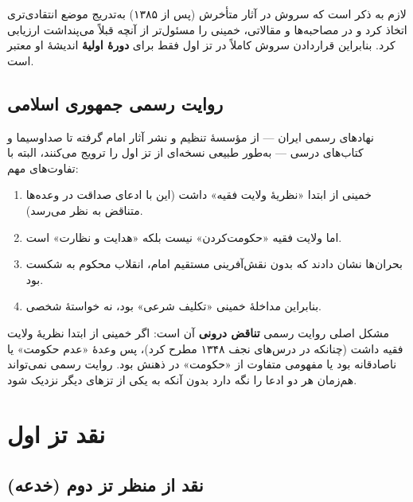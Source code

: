 \documentclass[12pt,a4paper]{book}
\newcommand{\keyword}[1]{\textbf{\textcolor{cPrimary}{#1}}}
\begin{document}
\begin{warningBox}
لازم به ذکر است که سروش در آثار متأخرش (پس از ۱۳۸۵) به‌تدریج موضع انتقادی‌تری اتخاذ کرد و در مصاحبه‌ها و مقالاتی، خمینی را مسئول‌تر از آنچه قبلاً می‌پنداشت ارزیابی کرد. بنابراین قراردادن سروش کاملاً در تز اول فقط برای \keyword{دورهٔ اولیهٔ} اندیشهٔ او معتبر است.
\end{warningBox}

\subsection{روایت رسمی جمهوری اسلامی}

نهادهای رسمی ایران — از مؤسسهٔ تنظیم و نشر آثار امام گرفته تا صداوسیما و کتاب‌های درسی — به‌طور طبیعی نسخه‌ای از تز اول را ترویج می‌کنند، البته با تفاوت‌های مهم:

\begin{principleBox}
\begin{enumerate}[label=\textcolor{cPrimary}{\arabic*.}, rightmargin=2em]
    \item خمینی از ابتدا «نظریهٔ ولایت فقیه» داشت (این با ادعای صداقت در وعده‌ها متناقض به نظر می‌رسد).
    \item اما ولایت فقیه «حکومت‌کردن» نیست بلکه «هدایت و نظارت» است.
    \item بحران‌ها نشان دادند که بدون نقش‌آفرینی مستقیم امام، انقلاب محکوم به شکست بود.
    \item بنابراین مداخلهٔ خمینی «تکلیف شرعی» بود، نه خواستهٔ شخصی.
\end{enumerate}
\end{principleBox}

\begin{warningBox}
مشکل اصلی روایت رسمی \keyword{تناقض درونی} آن است: اگر خمینی از ابتدا نظریهٔ ولایت فقیه داشت (چنانکه در درس‌های نجف ۱۳۴۸ مطرح کرد)، پس وعدهٔ «عدم حکومت» یا ناصادقانه بود یا مفهومی متفاوت از «حکومت» در ذهنش بود. روایت رسمی نمی‌تواند هم‌زمان هر دو ادعا را نگه دارد بدون آنکه به یکی از تزهای دیگر نزدیک شود.
\end{warningBox}

\section{نقد تز اول}

\subsection{نقد از منظر تز دوم (خدعه)}
\end{document}
